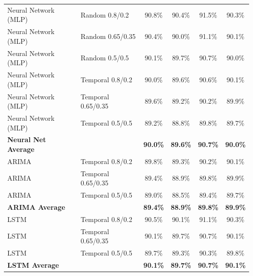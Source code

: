 \documentclass[11pt,a4paper]{article}
\begin{document}
\begin{table}[H]
\begin{tabular}{llcccc}
\midrule
Neural Network (MLP) & Random 0.8/0.2 & 90.8\% & 90.4\% & 91.5\% & 90.3\% \\
Neural Network (MLP) & Random 0.65/0.35 & 90.4\% & 90.0\% & 91.1\% & 90.1\% \\
Neural Network (MLP) & Random 0.5/0.5 & 90.1\% & 89.7\% & 90.7\% & 90.0\% \\
Neural Network (MLP) & Temporal 0.8/0.2 & 90.0\% & 89.6\% & 90.6\% & 90.1\% \\
Neural Network (MLP) & Temporal 0.65/0.35 & 89.6\% & 89.2\% & 90.2\% & 89.9\% \\
Neural Network (MLP) & Temporal 0.5/0.5 & 89.2\% & 88.8\% & 89.8\% & 89.7\% \\
\textbf{Neural Net Average} & & \textbf{90.0\%} & \textbf{89.6\%} & \textbf{90.7\%} & \textbf{90.0\%} \\
\midrule
ARIMA & Temporal 0.8/0.2 & 89.8\% & 89.3\% & 90.2\% & 90.1\% \\
ARIMA & Temporal 0.65/0.35 & 89.4\% & 88.9\% & 89.8\% & 89.9\% \\
ARIMA & Temporal 0.5/0.5 & 89.0\% & 88.5\% & 89.4\% & 89.7\% \\
\textbf{ARIMA Average} & & \textbf{89.4\%} & \textbf{88.9\%} & \textbf{89.8\%} & \textbf{89.9\%} \\
\midrule
LSTM & Temporal 0.8/0.2 & 90.5\% & 90.1\% & 91.1\% & 90.3\% \\
LSTM & Temporal 0.65/0.35 & 90.1\% & 89.7\% & 90.7\% & 90.1\% \\
LSTM & Temporal 0.5/0.5 & 89.7\% & 89.3\% & 90.3\% & 89.8\% \\
\textbf{LSTM Average} & & \textbf{90.1\%} & \textbf{89.7\%} & \textbf{90.7\%} & \textbf{90.1\%} \\
\bottomrule
\end{tabular}
\end{table}
\end{document}
